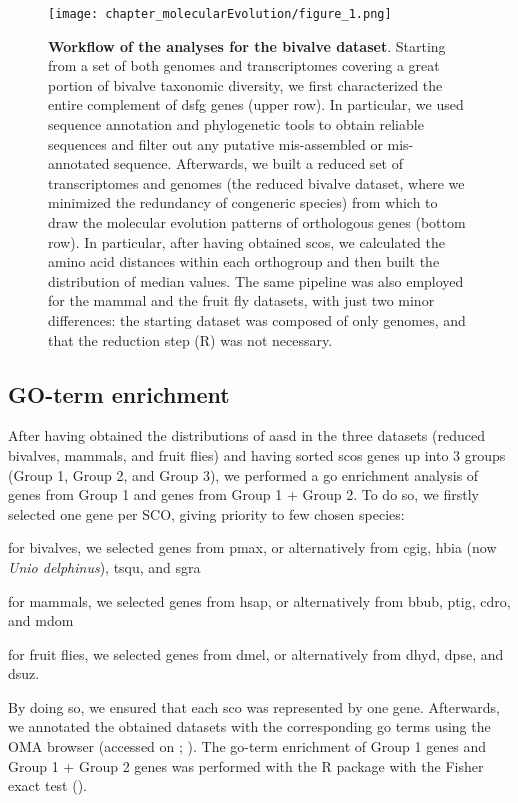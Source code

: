 \begingroup
\captionsetup[figure]{format=hruleformat}
\begin{figure}[t!]
	\centering
	\texttt{[image: chapter\_molecularEvolution/figure\_1.png]}
	\caption[\textbf{Workflow of the analyses for the bivalve dataset}]
	{
		\textbf{Workflow of the analyses for the bivalve dataset}. Starting from a set of both genomes and transcriptomes covering a great portion of bivalve taxonomic diversity, we first characterized the entire complement of \gls{dsfg} genes (upper row). In particular, we used sequence annotation and phylogenetic tools to obtain reliable sequences and filter out any putative mis-assembled or mis-annotated sequence. Afterwards, we built a reduced set of transcriptomes and genomes (the reduced bivalve dataset, where we minimized the redundancy of congeneric species) from which to draw the molecular evolution patterns of orthologous genes (bottom row). In particular, after having obtained \glspl{sco}, we calculated the amino acid distances within each orthogroup and then built the distribution of median values. The same pipeline was also employed for the mammal and the fruit fly datasets, with just two minor differences: the starting dataset was composed of only genomes, and that the reduction step (R) was not necessary.
	}
	\label{fig:workflow}
\end{figure}
\endgroup

\subsection{GO-term enrichment}
After having obtained the distributions of \gls{aasd} in the three datasets (reduced bivalves, mammals, and fruit flies) and having sorted \glspl{sco} genes up into 3 groups (Group 1, Group 2, and Group 3), we performed a \gls{go} enrichment analysis of genes from Group 1 and genes from Group 1 + Group 2. To do so, we firstly selected one gene per SCO, giving priority to few chosen species:
\begin{inlinelist}[itemjoin={{; }}]
	\item for bivalves, we selected genes from \gls{pmax}, or alternatively from \gls{cgig}, \gls{hbia} (now \textit{Unio delphinus}), \gls{tsqu}, and \gls{sgra}
	\item for mammals, we selected genes from \gls{hsap}, or alternatively from \gls{bbub}, \gls{ptig}, \gls{cdro}, and \gls{mdom}
	\item for fruit flies, we selected genes from \gls{dmel}, or alternatively from \gls{dhyd}, \gls{dpse}, and \gls{dsuz}.
\end{inlinelist}
By doing so, we ensured that each \gls{sco} was represented by one gene. Afterwards, we annotated the obtained datasets with the corresponding \gls{go} terms using the OMA browser (accessed on ; ). The \gls{go}-term enrichment of Group 1 genes and Group 1 + Group 2 genes was performed with the R package  with the Fisher exact test ().

